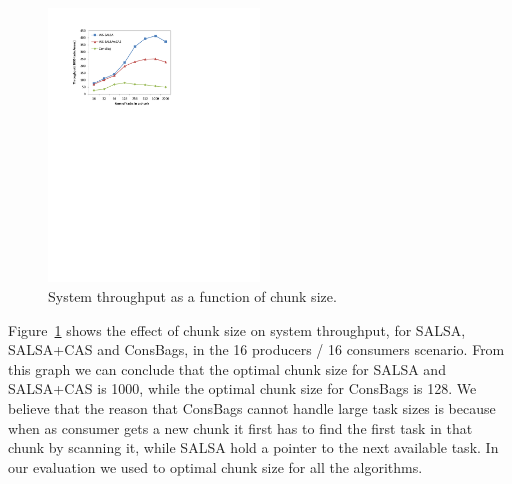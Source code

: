 \begin{figure}[htb]
 \begin{center}
   \includegraphics[width=0.5\textwidth]{figures/chunk-size}
 \end{center}
\caption{\footnotesize{System throughput as a function of chunk size. }}
	\label{fig:chunk-size}
\end{figure}
Figure~\ref{fig:chunk-size} shows the effect of chunk size on system throughput, for SALSA, SALSA+CAS and ConsBags, in the 16 producers / 16 consumers scenario. From this graph we can conclude that the optimal chunk size for SALSA and SALSA+CAS is 1000, while the optimal chunk size for ConsBags is 128. We believe that the reason that ConsBags cannot handle large task sizes is because when as consumer gets a new chunk it first has to find the first task in that chunk by scanning it, while SALSA hold a pointer to the next available task. In our evaluation we used to optimal chunk size for all the algorithms.
